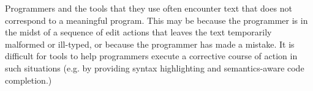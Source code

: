 






Programmers and the tools that they use often encounter text that does not correspond to a meaningful program. This may be because the programmer is in the midst of a sequence of 
edit actions that leaves the text temporarily malformed or ill-typed, or because the programmer has made a mistake. It is difficult for tools to help programmers execute a corrective course of action in such situations (e.g. by providing syntax highlighting and semantics-aware code completion.) %

